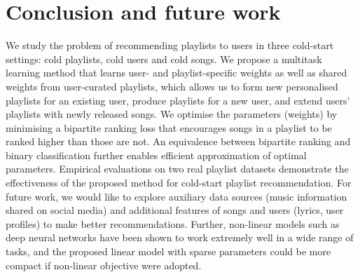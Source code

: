\section{Conclusion and future work}

We study the problem of recommending playlists to users in three cold-start settings:
cold playlists, cold users and cold songs.
We propose a multitask learning method that learns user- and playlist-specific weights 
as well as shared weights from user-curated playlists,
which allows us to form new personalised playlists for an existing user, %
produce playlists for a new user, %
and extend users' playlists with newly released songs. %
We optimise the parameters (\ie weights) %
by minimising a bipartite ranking loss
that encourages songs in a playlist to be ranked higher than those are not.
An equivalence between bipartite ranking and binary classification further enables efficient 
approximation of optimal parameters.
Empirical evaluations on two real playlist datasets demonstrate the effectiveness of the proposed method 
for cold-start playlist recommendation.
%
%
For future work, we would like to explore 
auxiliary data sources (\eg music information shared on social media) and additional features of songs and users 
(\eg lyrics, user profiles) %
to make better recommendations.
Further, non-linear models such as deep neural networks have been shown to work extremely well in a wide range of tasks,
and the proposed linear model with sparse parameters %
could be more compact if non-linear objective were adopted.

